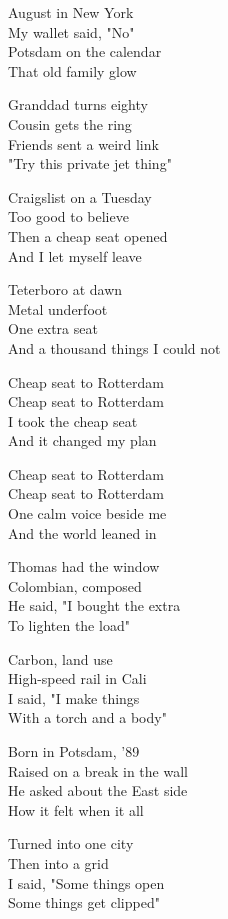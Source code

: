 \begin{lyrics}

August in New York\\
My wallet said, "No"\\
Potsdam on the calendar\\
That old family glow

Granddad turns eighty\\
Cousin gets the ring\\
Friends sent a weird link\\
"Try this private jet thing"

Craigslist on a Tuesday\\
Too good to believe\\
Then a cheap seat opened\\
And I let myself leave

Teterboro at dawn\\
Metal underfoot\\
One extra seat\\
And a thousand things I could not

Cheap seat to Rotterdam\\
Cheap seat to Rotterdam\\
I took the cheap seat\\
And it changed my plan

Cheap seat to Rotterdam\\
Cheap seat to Rotterdam\\
One calm voice beside me\\
And the world leaned in

Thomas had the window\\
Colombian, composed\\
He said, "I bought the extra\\
To lighten the load"

Carbon, land use\\
High-speed rail in Cali\\
I said, "I make things\\
With a torch and a body"

Born in Potsdam, '89\\
Raised on a break in the wall\\
He asked about the East side\\
How it felt when it all

Turned into one city\\
Then into a grid\\
I said, "Some things open\\
Some things get clipped"


\end{lyrics}
